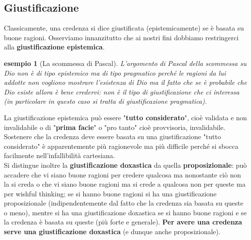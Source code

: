 \documentclass[10pt,a4paper]{article}
\newtheorem{esempio}{esempio}
\begin{document}
\subsection{Giustificazione}
Classicamente, una credenza si dice giustificata (epistemicamente) se è basata su buone ragioni. Osserviamo innanzitutto che ai nostri fini dobbiamo restringerci alla \textbf{giustificazione epistemica}. 
\begin{esempio}[La scommessa di Pascal]
	L'argomento di Pascal della scommessa su Dio non è di tipo epistemico ma di tipo pragmatico perché le ragioni da lui addotte non vogliono mostrare l'esistenza di Dio ma il fatto che se è probabile che Dio esiste allora è bene credervi: non è il tipo di giustificazione che ci interessa (in particolare in questo caso si tratta di giustificazione pragmatica).
\end{esempio}
La giustificazione epistemica può essere "\textbf{tutto considerato}", cioè validata e non invalidabile o di "\textbf{prima facie}" o "pro tanto" cioè provvisoria, invalidabile. Sostenere che la credenza deve essere basata su una giustificazione "tutto considerato" è apparentemente più ragionevole ma più difficile perché si sbocca facilmente nell'infallibilità cartesiana.\\
Si distingue inoltre la \textbf{giustificazione doxastica} da quella \textbf{proposizionale}: può accadere che vi siano buone ragioni per credere qualcosa ma nonostante ciò non la si creda o che vi siano buone ragioni ma si crede a qualcosa non per queste ma per wishful thinking; se si hanno buone ragioni si ha una giustificazione proposizionale (indipendentemente dal fatto che la credenza sia basata su queste o meno), mentre si ha una giustificazione doxastica se si hanno buone ragioni e se la credenza è basata su queste (più forte e generale). \textbf{Per avere una credenza serve una giustificazione doxastica} (e dunque anche proposizionale). 
\newpage 
\end{document}

